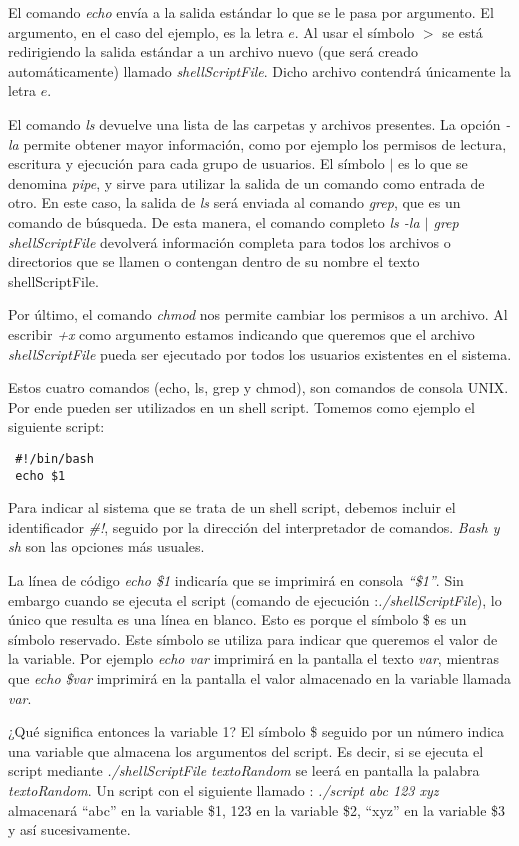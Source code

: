 El comando \textit{echo} envía a la salida estándar lo que se le pasa por argumento. El argumento, en el caso del ejemplo, es la letra $e$.
Al usar el símbolo $>$ se está redirigiendo la salida estándar a un archivo nuevo (que será creado automáticamente) llamado \textit{shellScriptFile}.
Dicho archivo contendrá únicamente la letra $e$.

El comando \textit{ls} devuelve una lista de las carpetas y archivos presentes. La opción \textit{-la} permite obtener mayor información, como por
ejemplo los permisos de lectura, escritura y ejecución para cada grupo de usuarios. El símbolo $|$ es lo que se denomina \textit{pipe}, y sirve
para utilizar la salida de un comando como entrada de otro. En este caso, la salida de \textit{ls} será enviada al comando \textit{grep}, que es un
comando de búsqueda. De esta manera, el comando completo \textit{ls -la $|$ grep shellScriptFile} devolverá información completa para todos los
archivos o directorios que se llamen o contengan dentro de su nombre el texto shellScriptFile.

Por último, el comando \textit{chmod} nos permite cambiar los permisos a un archivo. Al escribir \textit{+x} como argumento estamos indicando
que queremos que el archivo \textit{shellScriptFile} pueda ser ejecutado por todos los usuarios existentes en el sistema.

Estos cuatro comandos (echo, ls, grep y chmod), son comandos de consola UNIX. Por ende pueden ser utilizados en un shell script. Tomemos como
ejemplo el siguiente script:
\begin{lstlisting}
 #!/bin/bash
 echo $1
\end{lstlisting}

Para indicar al sistema que se trata de un shell script, debemos incluir el identificador \textit{\#!}, seguido por la dirección del interpretador
de comandos. \textit{Bash y sh} son las opciones más usuales. 

La línea de código \textit{echo \$1} indicaría que se imprimirá en consola \textit{``\$1''}.
Sin embargo cuando se ejecuta el script (comando de ejecución :\textit{./shellScriptFile}), lo único que resulta es una línea en blanco. 
Esto es porque el símbolo \$ es
un símbolo reservado. Este símbolo se utiliza para indicar que queremos el valor de la variable. Por ejemplo \textit{echo var} imprimirá en la pantalla
el texto \textit{var}, mientras que \textit{echo \$var} imprimirá en la pantalla el valor almacenado en la variable llamada \textit{var}.

¿Qué significa entonces la variable 1? El símbolo \$ seguido por un número indica una variable que almacena los argumentos del script. Es decir, si
se ejecuta el script mediante \textit{./shellScriptFile textoRandom} se leerá en pantalla la palabra \textit{textoRandom}. Un script con el
siguiente llamado : \textit{./script abc 123 xyz} almacenará ``abc'' en la variable \$1, 123 en la variable \$2, ``xyz'' en la variable \$3 y
así sucesivamente.

